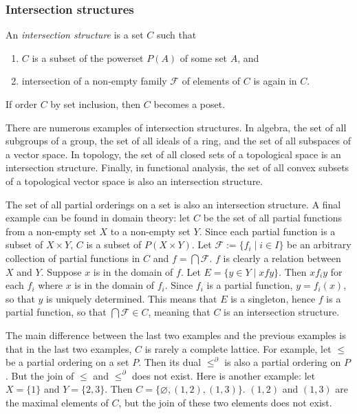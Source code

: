 \documentclass[12pt]{article}
\begin{document}
\subsubsection*{Intersection structures}

An \emph{intersection structure} is a set $C$ such that 
\begin{enumerate}
\item $C$ is a subset of the powerset $P(A)$ of some set $A$, and
\item intersection of a non-empty family $\mathcal{F}$ of elements of $C$ is again in $C$.
\end{enumerate}

If order $C$ by set inclusion, then $C$ becomes a poset.

There are numerous examples of intersection structures.  In algebra, the set of all subgroups of a group, the set of all ideals of a ring, and the set of all subspaces of a vector space.  In topology, the set of all closed sets of a topological space is an intersection structure.  Finally, in functional analysis, the set of all convex subsets of a topological vector space is also an intersection structure.

The set of all partial orderings on a set is also an intersection structure.  A final example can be found in domain theory: let $C$ be the set of all partial functions from a non-empty set $X$ to a non-empty set $Y$.  Since each partial function is a subset of $X\times Y$, $C$ is a subset of $P(X\times Y)$.  Let $\mathcal{F}:=\lbrace f_i\mid i\in I\rbrace$ be an arbitrary collection of partial functions in $C$ and $f=\bigcap \mathcal{F}$.  $f$ is clearly a relation between $X$ and $Y$.  Suppose $x$ is in the domain of $f$.  Let $E=\lbrace y\in Y\mid xfy\rbrace$.  Then $xf_i y$ for each $f_i$ where $x$ is in the domain of $f_i$.  Since $f_i$ is a partial function, $y=f_i(x)$, so that $y$ is uniquely determined.  This means that $E$ is a singleton, hence $f$ is a  partial function, so that $\bigcap \mathcal{F}\in C$, meaning that $C$ is an intersection structure.

The main difference between the last two examples and the previous examples is that in the last two examples, $C$ is rarely a complete lattice.  For example, let $\le$ be a partial ordering on a set $P$.  Then its dual $\le^{\partial}$ is also a partial ordering on $P$.  But the join of $\le$ and $\le^{\partial}$ does not exist.  Here is another example: let $X=\lbrace 1\rbrace$ and $Y=\lbrace 2,3\rbrace$.  Then $C=\lbrace \varnothing, (1,2),(1,3)\rbrace$.  $(1,2)$ and $(1,3)$ are the maximal elements of $C$, but the join of these two elements does not exist.
\end{document}
